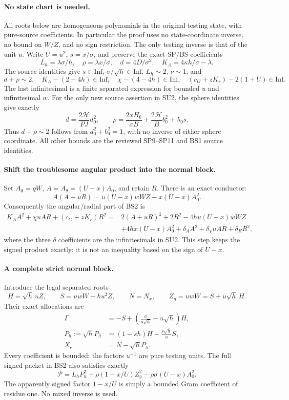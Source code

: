 \paragraph{No state chart is needed.}
All roots below are homogeneous polynomials in the original testing
state, with pure-source coefficients.  In particular the proof
uses no state-coordinate inverse, no bound on $W/Z$, and no sign
restriction.  The only testing inverse is that of the unit $u$.
Write $U=u^2$, $s=x/\sigma$, and preserve the exact SP/BS coefficients
\[
 L_h=\lambda\sigma/h,\quad \rho=\lambda x/\sigma,
 \quad d=4D/\sigma^2,\quad K_A=4\kappa h/\sigma-\lambda.
\]
The source identities give $s\in\mathrm{Inf}$,
$\sigma/\sqrt h\in\mathrm{Inf}$, $L_h\sim2$, $\nu\sim1$, and
\[
 d+\rho\sim2,\quad K_A-(2-4h)\in\mathrm{Inf},\quad
 \chi-(4-4h)\in\mathrm{Inf},\quad
 (c_G+zK_r)-2(1+U)\in\mathrm{Inf}.
 \tag{SU2}
\]
The last infinitesimal is a finite separated expression for bounded
$u$ and infinitesimal $w$.  For the only new source assertion in
SU2, the sphere identities give exactly
\[
 d=\frac{2\mathcal H}{PJ}d_0^2,\qquad
 \rho=\frac{2xH_0}{\sigma B}
       +\frac{2\mathcal H}{B}b_0^2+\lambda_0s.
 \tag{SU3}
\]
Thus $d+\rho\sim2$ follows from $d_0^2+b_0^2=1$, with no inverse
of either sphere coordinate.  All other bounds are the reviewed
SP9--SP11 and BS1 source identities.

\paragraph{Shift the troublesome angular product into the normal block.}
Set $A_0=qW$, $A=A_\theta=(U-x)A_0$, and retain $R$.
There is an exact conductor:
\[
 A(A+uR)=u(U-x)wWZ-x(U-x)A_0^2.
 \tag{SU4}
\]
Consequently the angular/radial part of BS2 is
\[
\begin{split}
 K_AA^2+\chi uAR+(c_G+zK_r)R^2
 ={}&2(A+uR)^2+2R^2-4hu(U-x)wWZ\\
 &+4hx(U-x)A_0^2+\delta_A A^2+
   \delta_\chi uAR+\delta_RR^2,
\end{split} \tag{SU5}
\]
where the three $\delta$ coefficients are the infinitesimals in
SU2.  This step keeps the signed product exactly; it is not an
inequality based on the sign of $U-x$.

\paragraph{A complete strict normal block.}
Introduce the legal separated roots
\[
 H=\sqrt h\,uZ,\qquad S=uwW-hu^2Z,\qquad N=N_x,
 \qquad Z_g=uwW=S+u\sqrt h\,H.
\]
Their exact allocations are
\[
\begin{split}
 \Gamma&=-S+\left(\frac{\sigma}{u\sqrt h}-u\sqrt h\right)H,\\
 P_h:=\sqrt h P_\beta&=(1-sh)H-\frac{s\sqrt h}{u}S,\\
 X_e&=N-\sqrt h P_h.
\end{split} \tag{SU6}
\]
Every coefficient is bounded; the factors $u^{-1}$ are pure testing
units.  The full signed packet in BS2 also satisfies exactly
\[
 \mathscr P=L_hP_h^2+
      \rho(1-x/U)Z_g^2-\rho\sigma(U-x)A_0^2.
 \tag{SU7}
\]
The apparently signed factor $1-x/U$ is simply a bounded Gram
coefficient of residue one.  No mixed inverse is used.


